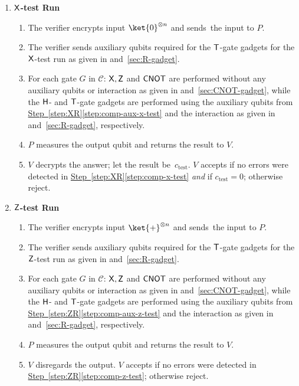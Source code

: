 \documentclass{toc}
\newcommand{\hgate}{{\sf H}}
\newcommand{\rgate}{{\sf T}}
\newcommand{\xgate}{{\sf X}}
\newcommand{\zgate}{{\sf Z}}
\newcommand{\cnot}{{\sf CNOT}}
\newcommand{\cC}{\mathcal{C}}
\newcommand{\stepref}[2]{\hyperref[#2]{Step~\ref{#1}\ref{#2}}}
\begin{document}
\begin{proof-system}
\begin{enumerate}
\begin{enumerate}[label=\Alph*.]
\item   \textbf{$\xgate$-test Run}\label{step:XR}
\begin{enumerate}[label*=\arabic*.,ref=\arabic*]
\item The verifier encrypts input $\ket{0}^{\otimes n}$  %
and sends~the input  to $P$.
\item  \label{step:comp-aux-x-test}The verifier sends auxiliary qubits required for the $\rgate$-gate gadgets for the $\xgate$-test run as given in
 and~\ref{sec:R-gadget}.
\item  \label{step:comp-x-test} For each gate $G$ in  $\cC$:  $\xgate, \zgate$ and $\cnot$ are performed without any auxiliary qubits or interaction as given in  and~\ref{sec:CNOT-gadget}, while the $\hgate$- and $\rgate$-gate gadgets are performed using the auxiliary qubits from \stepref{step:XR}{step:comp-aux-x-test} and the interaction as given in  and~\ref{sec:R-gadget}, respectively.
\item $P$ measures the output qubit and returns the result to $V$.
\item $V$ decrypts the answer; let the result be~$c_{\text{test}}$. $V$ accepts if no errors were detected in \stepref{step:XR}{step:comp-x-test} \emph{and} if $c_{\text{test}}=0$; otherwise reject.
\end{enumerate}

\item   \textbf{$\zgate$-test Run}\label{step:ZR}
\begin{enumerate}[label*=\arabic*.,ref=\arabic*]
\item The verifier encrypts input $\ket{+}^{\otimes n}$  %
and sends~the input  to $P$.
\item  \label{step:comp-aux-z-test}The verifier sends auxiliary qubits required for the $\rgate$-gate gadgets for the $\zgate$-test run as given in
 and~\ref{sec:R-gadget}.
\item \label{step:comp-z-test} For each gate $G$ in  $\cC$:  $\xgate, \zgate$ and $\cnot$ are performed without any auxiliary qubits or interaction as given in  and~\ref{sec:CNOT-gadget}, while the $\hgate$- and $\rgate$-gate gadgets are performed using the auxiliary qubits from \stepref{step:ZR}{step:comp-aux-z-test} and the interaction as given in  and~\ref{sec:R-gadget}, respectively.
    \item $P$ measures the output qubit and returns the result to $V$.
\item $V$ disregards the output. $V$ accepts if no errors were detected in \stepref{step:ZR}{step:comp-z-test}; otherwise reject.
\end{enumerate}
\end{enumerate}
\end{enumerate}
\end{proof-system}
\end{document}

